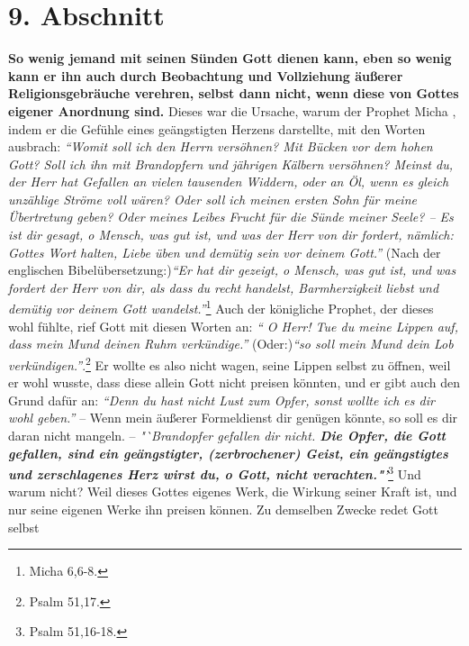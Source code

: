 \section{9. Abschnitt} \label{kap6_ab9}

\label{ref:06_09_gottesregeln}
\textbf{So wenig jemand mit seinen Sünden Gott dienen kann, eben so wenig kann
er ihn
auch durch Beobachtung und Vollziehung äußerer Religionsgebräuche verehren,
selbst dann nicht, wenn diese von Gottes eigener Anordnung sind.}
Dieses war die
Ursache, warum der Prophet Micha , indem er die Gefühle
eines geängstigten
Herzens darstellte, mit den Worten ausbrach:
\textit{"`Womit soll ich den Herrn versöhnen? Mit Bücken vor dem hohen Gott?
Soll ich ihn mit Brandopfern und jährigen Kälbern versöhnen? Meinst du, der
Herr hat Gefallen an vielen tausenden Widdern, oder an Öl, wenn es gleich
unzählige Ströme voll wären? Oder soll ich meinen ersten Sohn für meine
Übertretung geben? Oder meines Leibes Frucht für die Sünde meiner Seele? -- Es
ist dir gesagt, o Mensch, was gut ist, und was der Herr von dir fordert,
nämlich: Gottes Wort halten, Liebe üben und demütig sein vor deinem Gott."'}
(Nach der englischen Bibelübersetzung:)\textit{"`Er hat dir gezeigt,
o Mensch, was gut ist, und was fordert der Herr von dir, als dass du recht
handelst, Barmherzigkeit liebst und demütig vor deinem Gott
wandelst."'}\footnote{Micha 6,6-8.}
Auch der königliche Prophet, der dieses
wohl fühlte, rief Gott mit diesen Worten an:
\textit{"` O Herr! Tue du meine Lippen auf,
dass mein Mund deinen Ruhm verkündige."'} (Oder:)\textit{"`so soll mein Mund
dein Lob
verkündigen."'}.\footnote{Psalm 51,17.}
Er wollte es also nicht wagen,
seine Lippen selbst zu öffnen, weil er wohl wusste, dass diese allein Gott
nicht preisen könnten, und er gibt auch den Grund dafür an:
\textit{"`Denn du hast
nicht Lust zum Opfer, sonst wollte ich es dir wohl geben."'} -- Wenn mein
äußerer Formeldienst dir genügen könnte, so soll es dir daran nicht mangeln.
--
\textit{"`Brandopfer  gefallen dir nicht. \textbf{Die Opfer,
die Gott gefallen, sind ein geängstigter, (zerbrochener) Geist, ein
geängstigtes und zerschlagenes Herz wirst du, o Gott, nicht
verachten."'}}\footnote{Psalm 51,16-18.}
Und warum
nicht? Weil dieses Gottes eigenes Werk, die Wirkung seiner Kraft ist, und nur
seine eigenen Werke ihn preisen können. Zu demselben Zwecke redet Gott selbst
